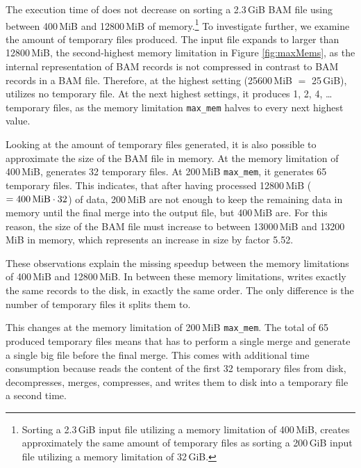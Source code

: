 The execution time of \sort does not decrease on sorting a 2.3\,GiB BAM file using between 400\,MiB and 12800\,MiB of memory.\footnote{Sorting a 2.3\,GiB input file utilizing a memory limitation of 400\,MiB, \sort creates approximately the same amount of temporary files as sorting a 200\,GiB input file utilizing a memory limitation of 32\,GiB.} To investigate further, we examine the amount of temporary files produced. The input file expands to larger than 12800\,MiB, the second-highest memory limitation in Figure \ref{fig:maxMems}, as the internal representation of BAM records is not compressed in contrast to BAM records in a BAM file. Therefore, at the highest setting (25600\,MiB $=$ 25\,GiB), \sort utilizes no temporary file. At the next highest settings, it produces 1, 2, 4, … temporary files, as the memory limitation \texttt{max\_mem} halves to every next highest value. 

Looking at the amount of temporary files generated, it is also possible to approximate the size of the BAM file in memory. At the memory limitation of 400\,MiB, \sort generates 32 temporary files. At 200\,MiB \texttt{max\_mem}, it generates 65 temporary files. This indicates, that after having processed 12800\,MiB ($= \text{400\,MiB} \cdot 32$) of data, 200\,MiB are not enough to keep the remaining data in memory until the final merge into the output file, but 400\,MiB are. \label{blowup}For this reason, the size of the BAM file must increase to between 13000\,MiB and 13200\,MiB in memory, which represents an increase in size by factor 5.52. 

These observations explain the missing speedup between the memory limitations of 400\,MiB and 12800\,MiB. In between these memory limitations, \sort writes exactly the same records to the disk, in exactly the same order. The only difference is the number of temporary files it splits them to. 

This changes at the memory limitation of 200\,MiB \texttt{max\_mem}. The total of 65 produced temporary files means that \sort has to perform a single merge and generate a single big file before the final merge. This comes with additional time consumption because \sort reads the content of the first 32 temporary files from disk, decompresses, merges, compresses, and writes them to disk into a temporary file a second time. 


